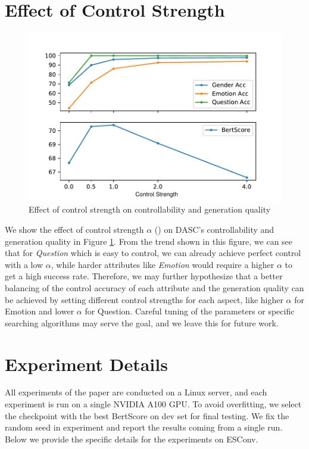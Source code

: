 
\appendix

\section{Effect of Control Strength}

\begin{figure}[ht]
    \centering
    \includegraphics[width=1.0\columnwidth]{figures/parameter_tune.pdf}
    \caption{Effect of control strength on controllability and generation quality}
    \label{fig:parameter_tune}
\end{figure}

We show the effect of control strength $\alpha$ () on DASC's controllability and generation quality in Figure \ref{fig:parameter_tune}. From the trend shown in this figure, we can see that for \textit{Question} which is easy to control, we can already achieve perfect control with a low $\alpha$, while harder attributes like \textit{Emotion} would require a higher $\alpha$ to get a high success rate. Therefore, we may further hypothesize that a better balancing of the control accuracy of each attribute and the generation quality can be achieved by setting different control strengths for each aspect, like higher $\alpha$ for Emotion and lower $\alpha$ for Question. Careful tuning of the parameters or specific searching algorithms \citep{gu2022distributional} may serve the goal, and we leave this for future work.

\section{Experiment Details}

All experiments of the paper are conducted on a Linux server, and each experiment is run on a single NVIDIA A100 GPU. To avoid overfitting, we select the checkpoint with the best BertScore on dev set for final testing. We fix the random seed in experiment and report the results coming from a single run. Below we provide the specific details for the experiments on ESConv.

